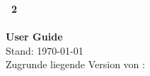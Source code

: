 \begin{titlepage}
	\vspace*{7cm}
	\begin{center}
    	\LARGE
		\textbf{\xirp~2\\\xirpname\\User Guide}\\
        \vspace{1cm}
        \large
        Stand: \today\\
		\vspace{1cm}
		\large
		Zugrunde liegende Version von \xirp: \version\\
	\end{center}
\end{titlepage}